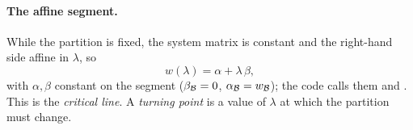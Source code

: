 \paragraph{The affine segment.}
While the partition is fixed, the system matrix is constant and the right-hand side
affine in $\lambda$, so
\begin{equation}
\label{eq:segment}
w(\lambda) = \alpha + \lambda\,\beta,
\end{equation}
with $\alpha,\beta$ constant on the segment ($\beta_{\mathcal{B}} = 0$, $\alpha_{\mathcal{B}} = w_{\mathcal{B}}$); the
code calls them  and . This is the \emph{critical line}.
A \emph{turning point} is a value of $\lambda$ at which the partition must change.
